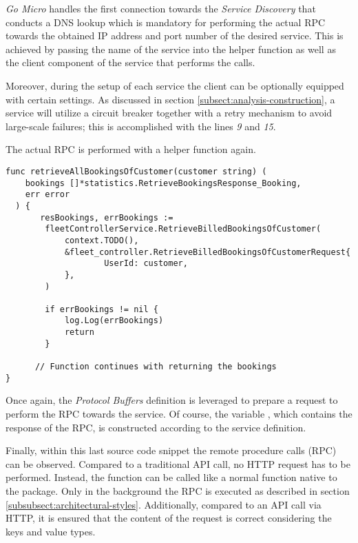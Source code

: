 \documentclass[12pt,a4paper,twoside]{report}
\begin{document}
\textit{Go Micro} handles the first connection towards the
\textit{Service Discovery} that conducts a DNS lookup which is mandatory
for performing the actual RPC towards the obtained IP address and port number
of the desired service.
This is achieved by passing the name of the service into the helper function
as well as the client component of the service that performs the calls.

Moreover, during the setup of each service the client can be optionally equipped
with certain settings. As discussed in section \ref{subsect:analysis-construction},
a service will utilize a circuit breaker together with a retry mechanism to
avoid large-scale failures; this is accomplished with
the lines \textit{9} and \textit{15}.

The actual RPC is performed with a helper function again.

\begin{lstlisting}[title=services/statistics/bookings.go]
func retrieveAllBookingsOfCustomer(customer string) (
    bookings []*statistics.RetrieveBookingsResponse_Booking,
    err error
  ) {
	   resBookings, errBookings :=
        fleetControllerService.RetrieveBilledBookingsOfCustomer(
            context.TODO(),
            &fleet_controller.RetrieveBilledBookingsOfCustomerRequest{
    		        UserId: customer,
    	    },
        )

    	if errBookings != nil {
    		log.Log(errBookings)
    		return
    	}

      // Function continues with returning the bookings
}
\end{lstlisting}

Once again, the \textit{Protocol Buffers} definition is leveraged to prepare
a request to perform the RPC towards the  service.
Of course, the variable , which contains the response of the RPC,
is constructed according to the service definition.

Finally, within this last source code snippet the remote procedure calls (RPC)
can be observed. Compared to a traditional API call, no HTTP request has to be
performed. Instead, the function 
can be called like a normal function native to the package.
Only in the background the RPC is executed as described
in section \ref{subsubsect:architectural-styles}.
Additionally, compared to an API call via HTTP, it is ensured that the content
of the request is correct considering the keys and value types.
\end{document}
